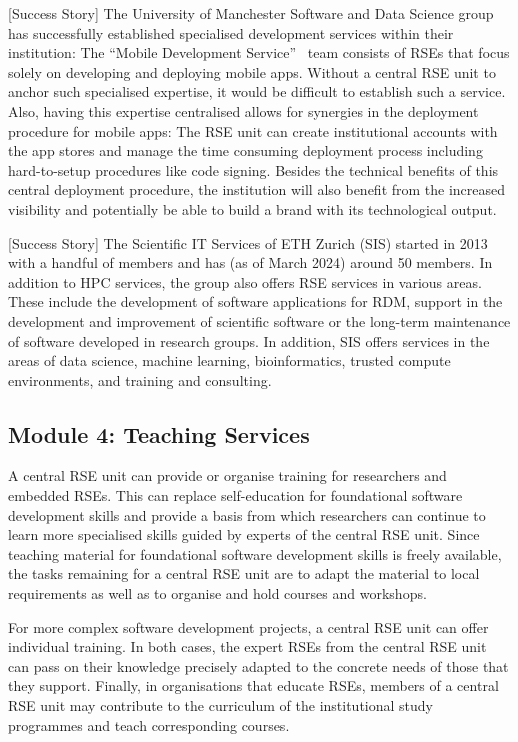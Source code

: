 \documentclass[a4paper]{article}
\begin{document}
[Success Story]
The University of Manchester Software and Data Science group has successfully established specialised development services within their institution:
The “Mobile Development Service”~\autocite{manchester_mobile} team consists of RSEs that focus solely on developing and deploying mobile apps.
Without a central RSE unit to anchor such specialised expertise, it would be difficult to establish such a service.
Also, having this expertise centralised allows for synergies in the deployment procedure for mobile apps:
The RSE unit can create institutional accounts with the app stores and manage the time consuming deployment process including hard-to-setup procedures like code signing.
Besides the technical benefits of this central deployment procedure, the institution will also benefit from the increased visibility and potentially be able to build a brand with its technological output.

[Success Story]
The Scientific IT Services of ETH Zurich (SIS) started in 2013 with a handful of members and has (as of March 2024) around 50 members.
In addition to HPC services, the group also offers RSE services in various areas.
These include the development of software applications for RDM, support in the development and improvement of scientific software or the long-term maintenance of software developed in research groups.
In addition, SIS offers services in the areas of data science, machine learning, bioinformatics, trusted compute environments, and training and consulting.

\subsection{Module 4: Teaching Services}%
\label{sec:teaching}

A central RSE unit can provide or organise training for researchers and embedded RSEs.
This can replace self-education for foundational software development skills and provide a basis from which researchers can continue to learn more specialised skills guided by experts of the central RSE unit.
Since teaching material for foundational software development skills is freely available,
 the tasks remaining for a central RSE unit are to adapt the material to local requirements as well as to organise and hold courses and workshops.

For more complex software development projects, a central RSE unit can offer individual training.
In both cases, the expert RSEs from the central RSE unit can pass on their knowledge precisely adapted to the concrete needs of those that they support.
Finally, in organisations that educate RSEs, members of a central RSE unit may contribute to the curriculum of the institutional study programmes and teach corresponding courses. 
\end{document}
